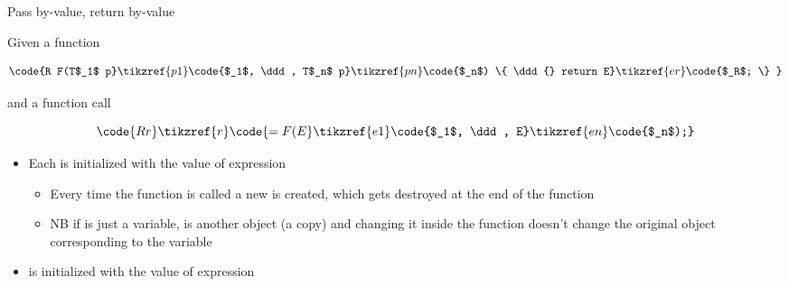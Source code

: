 \begin{frame}
\begin{columns}
  \end{columns}


\end{frame}

\begin{frame}{Pass by-value, return by-value}

  Given a function


  \begin{equation*}
    \code{R F(T$_1$ p}\tikzref{p1}\code{$_1$, \ddd, T$_n$ p}\tikzref{pn}\code{$_n$) \{ \ddd{} return E}\tikzref{er}\code{$_R$; \} }
  \end{equation*}

  and a function call

  \begin{equation*}
    \code{R r}\tikzref{r}\code{ = F(E}\tikzref{e1}\code{$_1$, \ddd, E}\tikzref{en}\code{$_n$);}
  \end{equation*}

  \begin{itemize}
  \item<2-> Each  is initialized with the value of expression
    \begin{itemize}
    \item Every time the function is called a new  is created, which
      gets destroyed at the end of the function
    \item NB if  is just a variable,  is another object
      (a copy) and changing it inside the function doesn't change the original
      object corresponding to the variable
    \end{itemize}
  \item<3->  is initialized with the value of expression 
  \end{itemize}


\end{frame}

